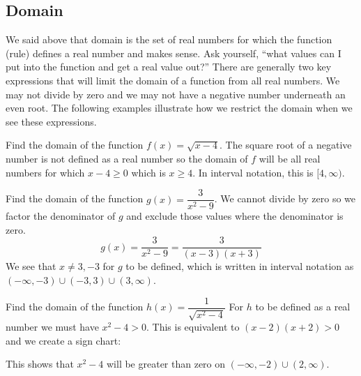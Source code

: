 \subsection{Domain}

We said above that domain is the set of real numbers for which the function (rule) defines a real number and makes sense. Ask yourself, ``what values can I put into the function and get a real value out?'' There are generally two key expressions that will limit the domain of a function from all real numbers. We may not divide by zero and we may not have a negative number underneath an even root. The following examples illustrate how we restrict the domain when we see these expressions.

\begin{example}\label{prereq_domain_1}
Find the domain of the function $f(x)=\sqrt{x-4}$.
\solution
The square root of a negative number is not defined as a real number so the domain of $f$ will be all real numbers for which $x-4\geq 0$ which is $x \geq 4$. In interval notation, this is $[4,\infty)$.
\end{example}

\begin{example}\label{prereq_domain_2}
Find the domain of the function $g(x)= \dfrac{3}{x^2-9}$.
\solution
We cannot divide by zero so we factor the denominator of $g$ and exclude those values where the denominator is zero.
\[g(x)=\frac3{x^2-9}=\frac3{(x-3)(x+3)}\]
We see that $x\neq 3,-3$ for $g$ to be defined, which is written in interval notation as $(-\infty,-3)\cup (-3,3)\cup (3,\infty)$.
\end{example}

\begin{example}\label{prereq_domain_3}
Find the domain of the function $h(x)=\dfrac1{\sqrt{x^2-4}}$
\solution
For $h$ to be defined as a real number we must have $x^2-4>0$. This is equivalent to $(x-2)(x+2)>0$ and we create a sign chart:

\begin{center}
\end{center}

This shows that $x^2-4$ will be greater than zero on $(-\infty,-2)\cup(2,\infty)$.
\end{example}


